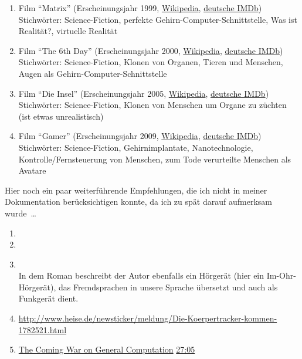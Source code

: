 \begin{enumerate}
	\item Film \enquote{Matrix}
		(Erscheinungsjahr 1999, \href{http://de.wikipedia.org/wiki/Matrix_(Film)}{Wikipedia},
		\href{http://www.imdb.de/title/tt0133093/}{deutsche IMDb}) \\
		Stichwörter: Science-Fiction, perfekte Gehirn-Computer-Schnittstelle,
		Was ist Realität?, virtuelle Realität
	\item Film \enquote{The 6th Day}
		(Erscheinungsjahr 2000, \href{http://de.wikipedia.org/wiki/The_6th_Day}{Wikipedia},
		\href{http://www.imdb.de/title/tt0216216/}{deutsche IMDb}) \\
		Stichwörter: Science-Fiction, Klonen von Organen, Tieren und Menschen,
			Augen als Gehirn-Computer-Schnittstelle
	\item Film \enquote{Die Insel}
		(Erscheinungsjahr 2005, \href{http://de.wikipedia.org/wiki/Die_Insel_(2005)}{Wikipedia},
		\href{http://www.imdb.de/title/tt0399201/}{deutsche IMDb}) \\
		Stichwörter: Science-Fiction, Klonen von Menschen um Organe zu züchten
			(ist etwas unrealistisch)
	\item Film \enquote{Gamer}
		(Erscheinungsjahr 2009, \href{http://de.wikipedia.org/wiki/Gamer}{Wikipedia},
		\href{http://www.imdb.de/title/tt1034032/}{deutsche IMDb}) \\
		Stichwörter: Science-Fiction, Gehirnimplantate, Nanotechnologie,
			Kontrolle/Fernsteuerung von Menschen,
			zum Tode verurteilte Menschen als Avatare
\end{enumerate}

\bigskip
Hier noch ein paar weiterführende Empfehlungen, die ich nicht in meiner Dokumentation
berücksichtigen konnte, da ich zu spät darauf aufmerksam wurde~\dots
\begin{enumerate}
	\item {}
	\item {}
	\item {} \\
		In dem Roman beschreibt der Autor ebenfalls ein Hörgerät (hier ein Im-Ohr-Hörgerät),
		das Fremdsprachen in unsere Sprache übersetzt und auch als Funkgerät dient.
	\item \url{http://www.heise.de/newsticker/meldung/Die-Koerpertracker-kommen-1782521.html}
	\item \href{http://events.ccc.de/congress/2011/Fahrplan/events/4848.en.html}{The Coming War on General Computation}
		\href{http://www.youtube.com/watch?v=HUEvRyemKSg#t=27m05s}{27:05}
\end{enumerate}



